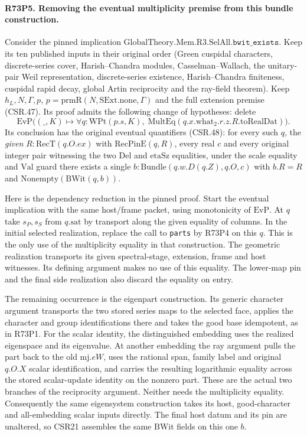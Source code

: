 \paragraph{R73P5. Removing the eventual multiplicity premise from this bundle construction.}
\label{claim:R73P5}
Consider the pinned implication
$\mathrm{GlobalTheory.Mem.R3.SelAll}.\texttt{bwit\_exists}$.
Keep its ten published inputs in their original order (Green cuspidal
characters, discrete-series cover, Harish--Chandra modules,
Casselman--Wallach, the unitary-pair Weil representation,
discrete-series existence, Harish--Chandra finiteness, cuspidal rapid
decay, global Artin reciprocity and the ray-field theorem). Keep
$h_L,N,\Gamma,p$, $p=\mathrm{prmR}(N,\mathrm{SExt.none},\Gamma)$
and the full extension premise (CSR.47). Its proof admits the following
change of hypotheses: delete
\[
 \mathrm{EvP}\bigl((\_,K)\longmapsto
       \forall q:\mathrm{WPt}(p.s,K),\;
       \mathrm{MultEq}(q.x.\mathrm{what}_2.r.z.R.\mathrm{toRealDat})\bigr).
\]
Its conclusion has the original eventual quantifiers (CSR.48): for every
such $q$, the \emph{given} $R:\mathrm{RecT}(q.O.ex)$ with
$\mathrm{RecPinE}(q,R)$, every real $c$ and every original integer
pair witnessing the two $\mathrm{Del}$ and $\mathrm{etaSz}$ equalities,
under the scale equality and $\mathrm{Val}$ guard there exists a
single $b:\mathrm{Bundle}(q.w.D(q.Z),q.O,c)$ with
$b.R=R$ and $\mathrm{Nonempty}(\mathrm{BWit}(q,b))$.

Here is the dependency reduction in the pinned proof. Start the
eventual implication with the same host/frame packet, using monotonicity
of $\mathrm{EvP}$. At $q$ take $s_P,s_S$ from $q.\mathrm{sat}$ by
transport along the given equality of columns. In the initial
selected realization, replace the call to \texttt{parts} by R73P4
on this $q$. This is the only use of the multiplicity equality in
that construction. The geometric realization transports its given
spectral-stage, extension, frame and host witnesses. Its defining
argument makes no use of this equality. The lower-map pin and the
final side realization also discard the equality on entry.

The remaining occurrence is the eigenpart construction. Its generic
character argument transports the two stored series maps to the
selected face, applies the character and group identifications there
and takes the good base idempotent, as in R73P1. For the scalar
identity, the distinguished embedding uses the realized eigenspace
and its eigenvalue. At another embedding the ray argument pulls the
part back to the old $\mathrm{mj}.eW$, uses the rational span,
family label and original $q.O.X$ scalar identification, and carries
the resulting logarithmic equality across the stored scalar-update
identity on the nonzero part. These are the actual two branches of
the reciprocity argument. Neither needs the multiplicity equality.
Consequently the same eigensystem construction takes its host,
good-character and all-embedding scalar inputs directly. The final
host datum and its pin are unaltered, so CSR21 assembles the same
$\mathrm{BWit}$ fields on this one $b$.

